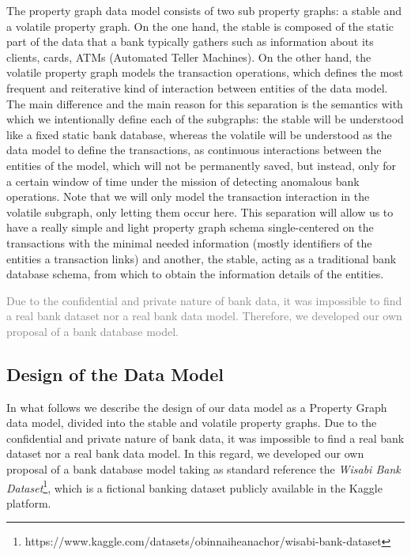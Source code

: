 The property graph data model consists of two sub property graphs: a stable and a volatile property graph. On the one hand, the stable is composed of the static part of the data that a bank typically gathers such as information about its clients, cards, ATMs (Automated Teller Machines). 
On the other hand, the volatile property graph models the transaction operations, which defines the most frequent and reiterative kind of interaction between entities of the data model.\\
The main difference and the main reason for this separation is the semantics with which we intentionally define each of the subgraphs: the stable will be understood like a fixed static bank database, whereas the volatile will be understood as the data model to define the transactions, as continuous interactions between the entities of the model, which will not be permanently saved, but instead, only for a certain window of time under the mission of detecting anomalous bank operations. Note that we will only model the transaction interaction in the volatile subgraph, only letting them occur here.
This separation will allow us to have a really simple and light property graph schema single-centered on the transactions with the minimal needed information (mostly identifiers of the entities a transaction links) and another, the stable, acting as a traditional bank database schema, from which to obtain the information details of the entities.

\textcolor{gray}{Due to the confidential and private nature of bank data, it was
impossible to find a real bank dataset nor a real bank data model. Therefore, we developed our own proposal of a bank database model.}

\subsection{Design of the Data Model}

In what follows we describe the design of our data model as a Property Graph data model, divided into the stable and volatile property graphs. Due to the confidential and private nature of bank data, it was impossible to find a real bank dataset nor a real bank data model. In this regard, we developed our own proposal of a bank database model taking as standard reference the \emph{Wisabi Bank Dataset}\footnote{https://www.kaggle.com/datasets/obinnaiheanachor/wisabi-bank-dataset}, which is a fictional banking dataset publicly available in the Kaggle platform.

